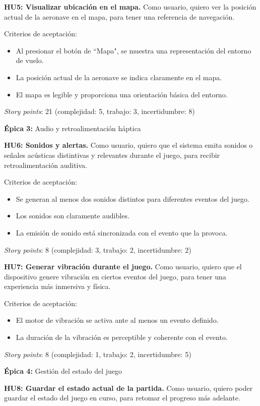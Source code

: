 \documentclass[
11pt, %
]{charter}
\begin{document}
	\textbf{HU5: Visualizar ubicación en el mapa.} Como usuario, quiero ver la posición actual de la aeronave en el mapa, para tener una referencia de navegación.

	Criterios de aceptación:
	\begin{itemize}
		\item Al presionar el botón de ``Mapa", se muestra una representación del entorno de vuelo.
		\item La posición actual de la aeronave se indica claramente en el mapa.
		\item El mapa es legible y proporciona una orientación básica del entorno.
	\end{itemize}
	\textit{Story points}: 21 (complejidad: 5, trabajo: 3, incertidumbre: 8)
		
\textbf{Épica 3:} Audio y retroalimentación háptica

	\textbf{HU6: Sonidos y alertas.} Como usuario, quiero que el sistema emita sonidos o señales acústicas distintivas y relevantes durante el juego, para recibir retroalimentación auditiva.

	Criterios de aceptación:
	\begin{itemize}
		\item Se generan al menos dos sonidos distintos para diferentes eventos del juego.
		\item Los sonidos son claramente audibles.
		\item La emisión de sonido está sincronizada con el evento que la provoca.
	\end{itemize}
	\textit{Story points}: 8 (complejidad: 3, trabajo: 2, incertidumbre: 2)
		
	\textbf{HU7: Generar vibración durante el juego.} Como usuario, quiero que el dispositivo genere vibración en ciertos eventos del juego, para tener una experiencia más inmersiva y física.

	Criterios de aceptación:
	\begin{itemize}
		\item El motor de vibración se activa ante al menos un evento definido.
		\item La duración de la vibración es perceptible y coherente con el evento.
	\end{itemize}
	\textit{Story points}: 8 (complejidad: 1, trabajo: 2, incertidumbre: 5)
		
\textbf{Épica 4:} Gestión del estado del juego

	\textbf{HU8: Guardar el estado actual de la partida.} Como usuario, quiero poder guardar el estado del juego en curso, para retomar el progreso más adelante.
\end{document}

